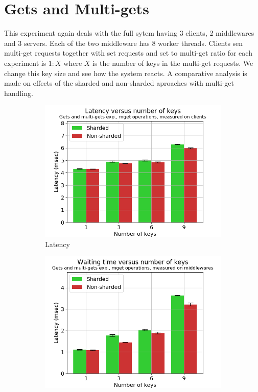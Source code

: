 \documentclass[11pt,a4paper]{article}
\begin{document}
\section{Gets and Multi-gets} \label{sec:gmg}
This experiment again deals with the full sytem having 3 clients, 2 middlewares and 3 servers. Each of the two middleware has 8 worker threads. Clients sen multi-get requests together with set requests and set to multi-get ratio for each experiment is $1:X$ where $X$ is the number of keys in the multi-get requests. We change this key size and see how the system reacts. A comparative analysis is made on effects of the sharded and non-sharded aproaches with multi-get handling.
\begin{figure}[h]
\begin{subfigure}{.5\textwidth}
  \centering
  \includegraphics[width=1.0\linewidth ,trim={5px 0px 20px 0px},clip]{img/plot/gmg-mget-lat_cli.png}
  \caption{Latency}
  \label{fig:gmg-mget-lat_cli}
\end{subfigure}%
\begin{subfigure}{.5\textwidth}
  \centering
  \includegraphics[width=1.0\linewidth ,trim={5px 0px 20px 0px},clip]{img/plot/gmg-mget-wtime_mw.png}

\end{subfigure}
\end{figure}
\end{document}

